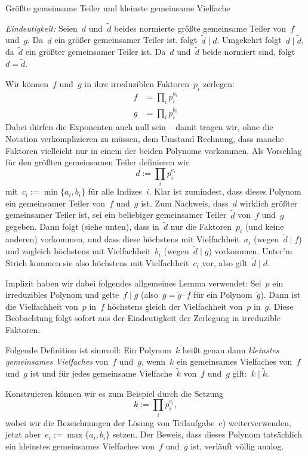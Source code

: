 \documentclass{algblatt}
\begin{document}
\begin{aufgabe}{Größte gemeinsame Teiler und kleinste gemeinsame Vielfache}
\begin{loesungE}
\emph{Eindeutigkeit:} Seien~$d$ und~$\widetilde d$ beides normierte
größte gemeinsame Teiler von~$f$ und~$g$. Da~$d$ ein größer gemeinsamer Teiler
ist, folgt~$\widetilde d \mid d$. Umgekehrt folgt~$d \mid \widetilde d$,
da~$\widetilde d$ ein größter gemeinsamer Teiler ist. Da~$d$ und~$\widetilde d$
beide normiert sind, folgt~$d = \widetilde d$.

\item Wir können~$f$ und~$g$ in ihre irreduziblen Faktoren~$p_i$ zerlegen:
\begin{align*}
  f &= \prod_i p_i^{a_i} \\
  g &= \prod_i p_i^{b_i}
\end{align*}
Dabei dürfen die Exponenten auch null sein -- damit tragen wir, ohne die
Notation verkomplizieren zu müssen, dem Umstand Rechnung, dass manche Faktoren
vielleicht nur in einem der beiden Polynome vorkommen. Als Vorschlag für den
größten gemeinsamen Teiler definieren wir
\[ d := \prod_i p_i^{c_i} \]
mit~$c_i := \min\{ a_i, b_i \}$ für alle Indizes~$i$. Klar ist zumindest, dass
dieses Polynom ein gemeinsamer Teiler von~$f$ und~$g$ ist. Zum Nachweis,
dass~$d$ wirklich größter gemeinsamer Teiler ist, sei ein beliebiger
gemeinsamer Teiler~$\widetilde d$ von~$f$ und~$g$ gegeben. Dann folgt (siehe
unten), dass in~$\widetilde d$ nur die Faktoren~$p_i$ (und keine anderen)
vorkommen, und dass diese höchstens mit Vielfachheit~$a_i$ (wegen~$\widetilde d
\mid f$) und zugleich höchstens mit Vielfachheit~$b_i$ (wegen~$\widetilde d
\mid g$) vorkommen. Unter'm Strich kommen sie also höchstens mit
Vielfachheit~$c_i$ vor, also gilt~$\widetilde d \mid d$.

Implizit haben wir dabei folgendes allgemeines Lemma verwendet: Sei~$p$ ein irreduzibles
Polynom und gelte~$f \mid g$ (also~$g = \widetilde g \cdot f$ für ein
Polynom~$\widetilde g$). Dann ist die Vielfachheit von~$p$ in~$f$
höchstens gleich der Vielfachheit von~$p$ in~$g$. Diese Beobachtung folgt
sofort aus der Eindeutigkeit der Zerlegung in irreduzible Faktoren.

\item Folgende Definition ist sinnvoll: Ein Polynom~$k$ heißt genau dann
\emph{kleinstes gemeinsames Vielfaches} von~$f$ und~$g$, wenn~$k$ ein
gemeinsames Vielfaches von~$f$ und~$g$ ist und für jedes gemeinsame
Vielfache~$\widetilde k$ von~$f$ und~$g$ gilt:~$k \mid \widetilde k$.

Konstruieren können wir es zum Beispiel durch die Setzung
\[ k := \prod_i p_i^{e_i}, \]
wobei wir die Bezeichnungen der Lösung von Teilaufgabe~c) weiterverwenden,
jetzt aber~$e_i := \max\{ a_i, b_i \}$ setzen. Der Beweis, dass dieses Polynom
tatsächlich ein kleinstes gemeinsames Vielfaches von~$f$ und~$g$ ist, verläuft
völlig analog.


\end{loesungE}
\end{aufgabe}
\end{document}
